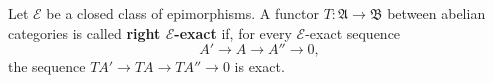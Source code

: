 Let $\mathcal{E}$ be a closed class of epimorphisms. A functor $T : \mathfrak{A} \rightarrow \mathfrak{B}$ between abelian categories is called \textbf{right $\mathcal{E}$-exact} if, for every $\mathcal{E}$-exact sequence
$$A' \rightarrow A \rightarrow A'' \rightarrow 0,$$
the sequence $TA' \rightarrow TA \rightarrow TA'' \rightarrow 0$ is exact.
